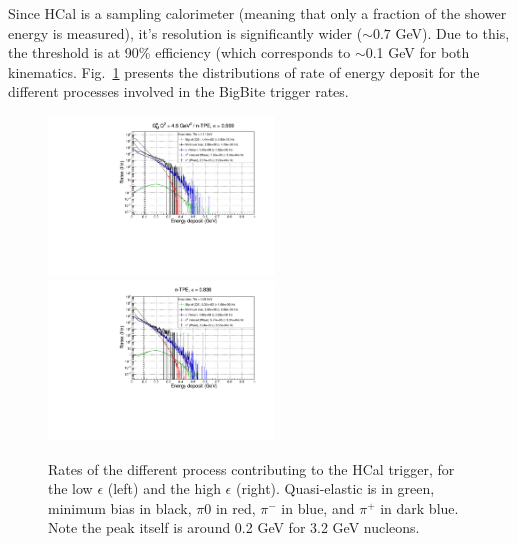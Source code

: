 Since HCal is a sampling calorimeter (meaning that only a fraction of the shower energy is measured), it's resolution is significantly wider ($\sim0.7$ GeV).
Due to this, the threshold is at 90\% efficiency (which corresponds to $\sim$0.1 GeV for both kinematics.
Fig.~\ref{fig:HCalRates} presents the distributions of rate of energy deposit for the different processes involved in the BigBite trigger rates.
%
\begin{figure}[!h]
  \begin{center}
    \includegraphics[width=6cm]{Plots/HCalRates_gen-tpe_le.pdf}
    \includegraphics[width=6cm]{Plots/HCalRates_gen-tpe_he.pdf}
    \caption{Rates of the different process contributing to the HCal trigger, for the low $\epsilon$ (left) and the high $\epsilon$ (right). Quasi-elastic is in green, minimum bias in black, $\pi0$ in red, $\pi^-$ in blue, and $\pi^+$ in dark blue. Note the peak itself is around 0.2 GeV for 3.2 GeV nucleons.}
    \label{fig:HCalRates}
  \end{center}
\end{figure}
%

